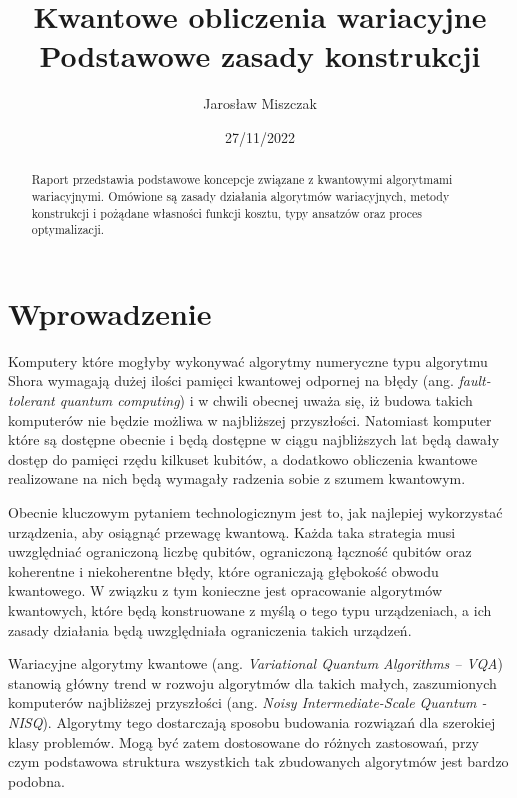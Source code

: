 \documentclass[a4paper,11pt]{article}
\newcommand{\ang}[1]{(ang. \emph{#1})}
\begin{document}
\title{Kwantowe obliczenia wariacyjne\\ {\normalsize Podstawowe zasady konstrukcji}}

\author{Jarosław Miszczak}
\date{27/11/2022}

\maketitle

\begin{abstract}
Raport przedstawia podstawowe koncepcje związane z kwantowymi algorytmami wariacyjnymi. Omówione są zasady działania algorytmów wariacyjnych, metody konstrukcji i pożądane własności funkcji kosztu, typy ansatzów oraz proces optymalizacji.
\end{abstract}


\hypertarget{wprowadzenie}{%
\section{Wprowadzenie}\label{wprowadzenie}}

Komputery które mogłyby wykonywać algorytmy numeryczne typu algorytmu Shora wymagają dużej ilości pamięci kwantowej odpornej na błędy \ang{fault-tolerant quantum computing} i w chwili obecnej uważa się, iż budowa takich komputerów nie będzie możliwa w najbliższej przyszłości. Natomiast komputer które są dostępne obecnie i będą dostępne w ciągu najbliższych lat będą dawały dostęp do pamięci rzędu kilkuset kubitów, a dodatkowo obliczenia kwantowe realizowane na nich będą wymagały radzenia sobie z szumem kwantowym. 
 
Obecnie kluczowym pytaniem technologicznym jest to, jak najlepiej wykorzystać  urządzenia, aby osiągnąć przewagę kwantową. Każda taka strategia musi uwzględniać ograniczoną liczbę qubitów, ograniczoną łączność qubitów oraz koherentne i niekoherentne błędy, które ograniczają głębokość obwodu kwantowego. W związku z tym konieczne jest opracowanie algorytmów kwantowych, które będą konstruowane z myślą o tego typu urządzeniach, a ich zasady działania będą uwzględniała ograniczenia takich urządzeń.
 
Wariacyjne algorytmy kwantowe \ang{Variational Quantum Algorithms -- VQA} stanowią główny trend w rozwoju algorytmów dla takich małych, zaszumionych komputerów najbliższej przyszłości \ang{Noisy Intermediate-Scale Quantum - NISQ}. Algorytmy tego dostarczają sposobu budowania rozwiązań dla szerokiej klasy problemów. Mogą być zatem dostosowane do różnych zastosowań, przy czym podstawowa struktura wszystkich tak zbudowanych algorytmów jest bardzo podobna.
\end{document}
